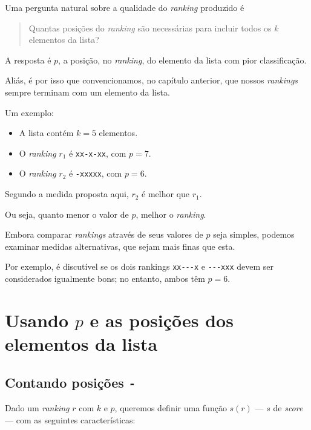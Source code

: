 \documentclass[
  letterpaper,
  DIV=11,
  numbers=noendperiod]{scrreprt}
\begin{document}
Uma pergunta natural sobre a qualidade do \emph{ranking} produzido é

\begin{quote}
Quantas posições do \emph{ranking} são necessárias para incluir todos os
$k$ elementos da lista?
\end{quote}

A resposta é $p$, a posição, no \emph{ranking}, do elemento da lista com
pior classificação.

Aliás, é por isso que convencionamos, no capítulo anterior, que nossos
\emph{rankings} sempre terminam com um elemento da lista.

Um exemplo:

\begin{itemize}
\item
  A lista contém $k = 5$ elementos.
\item
  O \emph{ranking} $r_1$ é \texttt{xx-x-xx}, com $p = 7$.
\item
  O \emph{ranking} $r_2$ é \texttt{-xxxxx}, com $p = 6$.
\end{itemize}

Segundo a medida proposta aqui, $r_2$ é melhor que $r_1$.

Ou seja, quanto menor o valor de $p$, melhor o \emph{ranking}.

Embora comparar \emph{rankings} através de seus valores de $p$ seja
simples, podemos examinar medidas alternativas, que sejam mais finas que
esta.

Por exemplo, é discutível se os dois rankings \texttt{xx-\/-\/-x} e
\texttt{-\/-\/-xxx} devem ser considerados igualmente bons; no entanto,
ambos têm $p = 6$.

\section{\texorpdfstring{Usando $p$ e as posições dos elementos da
lista}{Usando  e as posições dos elementos da lista}}\label{usando-p-e-as-posiuxe7uxf5es-dos-elementos-da-lista}

\subsection{\texorpdfstring{Contando posições
\texttt{-}}{Contando posições -}}\label{contando-posiuxe7uxf5es--}

Dado um \emph{ranking} $r$ com $k$ e $p$, queremos definir uma função
$s(r)$ --- $s$ de \emph{score} --- com as seguintes características:
\end{document}
